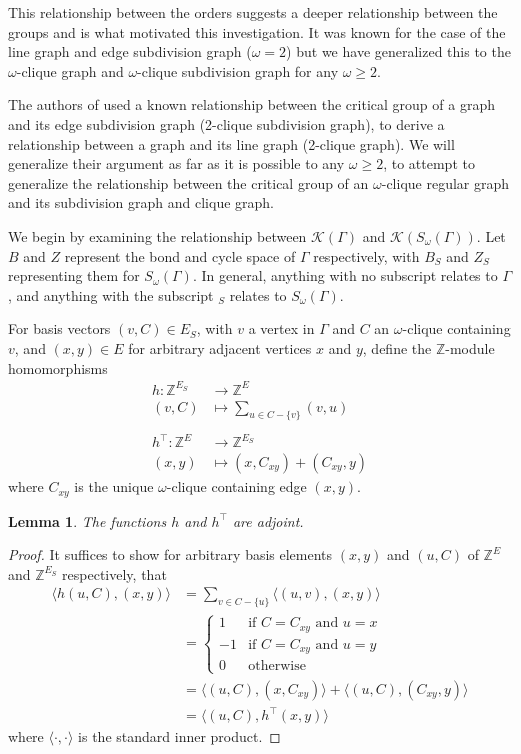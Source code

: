 \documentclass[12pt]{report}
\newtheorem{lem}[thm]{Lemma}
\theoremstyle{definition}
\def\ZZ{{\mathbb Z}}
\begin{document}
This relationship between the orders suggests a deeper relationship between the groups and is what motivated this investigation. It was known for the case of the line graph and edge subdivision graph ($\omega =2$) but we have generalized this to the $\omega$-clique graph and $\omega$-clique subdivision graph for any $\omega\geq 2$.\par
The authors of \cite{reiner} used a known relationship between the critical group of a graph and its edge subdivision graph (2-clique subdivision graph), to derive a relationship between a graph and its line graph (2-clique graph). We will generalize their argument as far as it is possible to any $\omega\geq2$, to attempt to generalize the relationship between the critical group of an $\omega$-clique regular graph and its subdivision graph and clique graph.\par
We begin by examining the relationship between $\mathcal{K}(\Gamma)$ and $\mathcal{K}(S_\omega(\Gamma))$. Let $B$ and $Z$ represent the bond and cycle space of $\Gamma$ respectively, with $B_S$ and $Z_S$ representing them for $S_\omega(\Gamma)$. In general, anything with no subscript relates to $\Gamma$, and anything with the subscript $_S$ relates to $S_\omega(\Gamma)$.\par
For basis vectors $(v,C)\in E_S$, with $v$ a vertex in $\Gamma$ and $C$ an $\omega$-clique containing $v$, and $(x,y)\in E$ for arbitrary adjacent vertices $x$ and $y$, define the $\ZZ$-module homomorphisms
\begin{align*}
    h:\mathbb{Z}^{E_S} &\rightarrow \mathbb{Z}^E \\
    (v,C) &\mapsto \sum_{u \in C-\{v\}}(v,u) \\
    \\
    h^\top:\mathbb{Z}^E &\rightarrow \mathbb{Z}^{E_S} \\
    (x,y) &\mapsto (x,C_{xy}) +(C_{xy},y)
\end{align*} where $C_{xy}$ is the unique $\omega$-clique containing edge $(x, y)$.
\clearpage
\begin{lem}
    The functions $h$ and $h^\top$ are adjoint.
\end{lem}
\begin{proof}
    It suffices to show for arbitrary basis elements $(x,y)$ and $(u,C)$ of $\mathbb{Z}^{E}$ and $\mathbb{Z}^{E_S}$ respectively, that
    \begin{align*}
    \langle h(u,C), (x,y) \rangle &= \sum_{v \in C - \{ u \}} \langle (u,v), (x,y) \rangle \\
    &= \begin{cases}
        1 & \text{if $C = C_{xy}$ and $u = x$} \\
        -1 & \text{if $C = C_{xy}$ and $u = y$} \\
        0 & \text{otherwise}
    \end{cases} \\
    &= \langle (u, C), (x, C_{xy}) \rangle + \langle (u, C), (C_{xy}, y) \rangle \\
    &= \langle (u,C), h^\top(x,y)\rangle
\end{align*}
where $\langle \cdot,\cdot\rangle$ is the standard inner product.
\end{proof}
\end{document}
